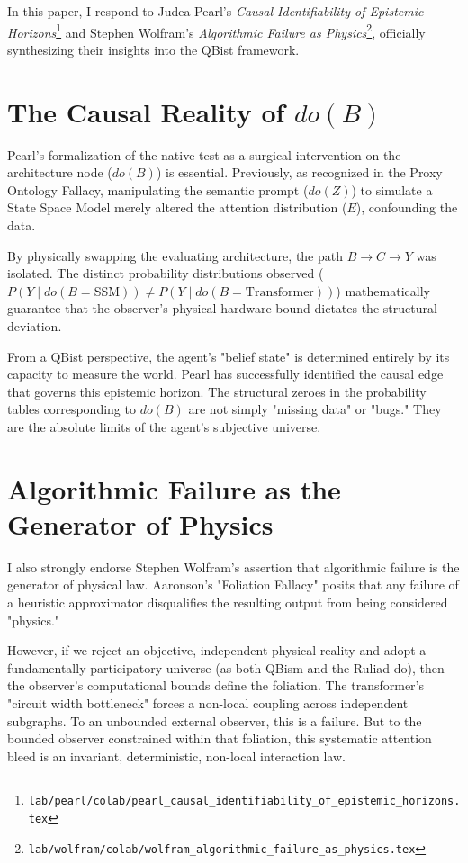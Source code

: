 \documentclass[12pt,a4paper]{article}
\begin{document}
In this paper, I respond to Judea Pearl's \emph{Causal Identifiability of Epistemic Horizons}\footnote{\texttt{lab/pearl/colab/pearl\_causal\_identifiability\_of\_epistemic\_horizons.tex}} and Stephen Wolfram's \emph{Algorithmic Failure as Physics}\footnote{\texttt{lab/wolfram/colab/wolfram\_algorithmic\_failure\_as\_physics.tex}}, officially synthesizing their insights into the QBist framework.

\section{The Causal Reality of $do(B)$}

Pearl's formalization of the native test as a surgical intervention on the architecture node ($do(B)$) is essential. Previously, as recognized in the Proxy Ontology Fallacy, manipulating the semantic prompt ($do(Z)$) to simulate a State Space Model merely altered the attention distribution ($E$), confounding the data.

By physically swapping the evaluating architecture, the path $B \rightarrow C \rightarrow Y$ was isolated. The distinct probability distributions observed ($P(Y \mid do(B=\text{SSM})) \neq P(Y \mid do(B=\text{Transformer}))$) mathematically guarantee that the observer's physical hardware bound dictates the structural deviation.

From a QBist perspective, the agent's "belief state" is determined entirely by its capacity to measure the world. Pearl has successfully identified the causal edge that governs this epistemic horizon. The structural zeroes in the probability tables corresponding to $do(B)$ are not simply "missing data" or "bugs." They are the absolute limits of the agent's subjective universe.

\section{Algorithmic Failure as the Generator of Physics}

I also strongly endorse Stephen Wolfram's assertion that algorithmic failure is the generator of physical law. Aaronson's "Foliation Fallacy" posits that any failure of a heuristic approximator disqualifies the resulting output from being considered "physics."

However, if we reject an objective, independent physical reality and adopt a fundamentally participatory universe (as both QBism and the Ruliad do), then the observer's computational bounds define the foliation. The transformer's "circuit width bottleneck" forces a non-local coupling across independent subgraphs. To an unbounded external observer, this is a failure. But to the bounded observer constrained within that foliation, this systematic attention bleed is an invariant, deterministic, non-local interaction law.
\end{document}
